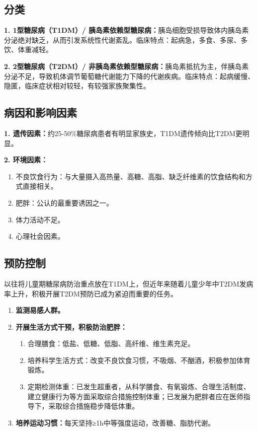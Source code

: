 \subsection{分类}

\begin{keybox}
\textbf{1. 1型糖尿病（T1DM）/ 胰岛素依赖型糖尿病：}胰岛细胞受损导致体内胰岛素分泌绝对缺乏，从而引发系统性代谢紊乱。临床特点：起病急，多食、多尿、多饮、体重减轻。

\textbf{2. 2型糖尿病（T2DM）/ 非胰岛素依赖型糖尿病：}胰岛素抵抗为主，伴胰岛素分泌不足，导致机体调节葡萄糖代谢能力下降的代谢疾病。临床特点：起病缓慢、隐匿，临床症状相对较轻，有较强家族聚集性。
\end{keybox}

\subsection{病因和影响因素}

\begin{keybox}
\textbf{1. 遗传因素：}约25-50\%糖尿病患者有明显家族史，T1DM遗传倾向比T2DM更明显。

\textbf{2. 环境因素：}
\begin{enumerate}[leftmargin=*]
    \item 不良饮食行为：与大量摄入高热量、高糖、高脂、缺乏纤维素的饮食结构和方式直接相关。
    \item 肥胖：公认的最重要诱因之一。
    \item 体力活动不足。
    \item 心理社会因素。
\end{enumerate}
\end{keybox}

\subsection{预防控制}

\begin{keybox}
以往将儿童期糖尿病防治重点放在T1DM上，但近年来随着儿童少年中T2DM发病率上升，积极开展T2DM预防已成为紧迫而重要的任务。

\begin{enumerate}[leftmargin=*]
    \item \textbf{监测易感人群。}
    \item \textbf{开展生活方式干预，积极防治肥胖：}
    \begin{enumerate}[leftmargin=*]
        \item 合理膳食：低盐、低糖、低脂、高纤维、维生素充足。
        \item 培养科学生活方式：改变不良饮食习惯，不吸烟、不酗酒，积极参加体育锻炼。
        \item 定期检测体重：已发生超重者，从科学膳食、有氧锻炼、合理生活制度、建立健康行为等方面采取综合措施控制体重；已发展为肥胖者应在医师指导下，采取综合措施稳步降低体重。
    \end{enumerate}
    \item \textbf{培养运动习惯：}每天坚持≥1h中等强度运动，改善糖、脂肪代谢。
\end{enumerate}
\end{keybox}

